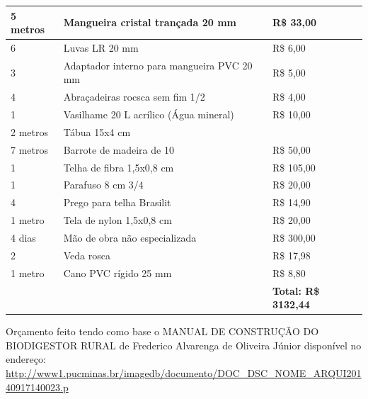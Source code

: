 \begin{table}[!h]
\begin{tabular}{|l|l|l|}
5 metros & Mangueira cristal trançada 20 mm & R\$ 33,00 \\ \hline
6 & Luvas LR 20 mm & R\$ 6,00 \\ \hline
3 & Adaptador interno para mangueira PVC 20 mm & R\$ 5,00 \\ \hline
4 & Abraçadeiras rocsca sem fim 1/2 & R\$ 4,00 \\ \hline
1 & Vasilhame 20 L acrílico (Água mineral) & R\$ 10,00 \\ \hline
2 metros & Tábua 15x4 cm &  \\ \hline
7 metros & Barrote de madeira de 10 & R\$ 50,00 \\ \hline
1 & Telha de fibra 1,5x0,8 cm & R\$ 105,00 \\ \hline
1 & Parafuso 8 cm 3/4 & R\$ 20,00 \\ \hline
4 & Prego para telha Brasilit & R\$ 14,90 \\ \hline
1 metro & Tela de nylon 1,5x0,8 cm & R\$ 20,00 \\ \hline
4 dias & Mão de obra não especializada & R\$ 300,00 \\ \hline
2 & Veda rosca & R\$ 17,98 \\ \hline
1 metro & Cano PVC rígido 25 mm & R\$ 8,80 \\ \hline
 &  & \textbf{Total: R\$ 3132,44} \\ \hline
\end{tabular}
\end{table}

Orçamento feito tendo como base o MANUAL DE CONSTRUÇÃO DO BIODIGESTOR RURAL de Frederico Alvarenga de Oliveira Júnior disponível no endereço: \url{http://www1.pucminas.br/imagedb/documento/DOC_DSC_NOME_ARQUI20140917140023.p}
